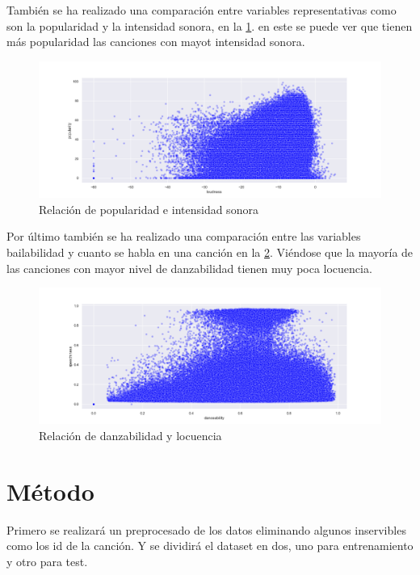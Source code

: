 \documentclass{wsdcr}
\begin{document}
También se ha realizado una comparación entre variables representativas como son la popularidad y la intensidad sonora, en la \figurename{\ref*{fig:relacion popularidad e intensidad sonora}}. en este se puede ver que tienen más popularidad las canciones con mayot intensidad sonora.

\begin{figure}[h!] \includegraphics[width=\columnwidth]{images/popularity_loudness_scatterplot.png} \caption{Relación de popularidad e intensidad sonora} \label{fig:relacion popularidad e intensidad sonora} \end{figure}

Por último también se ha realizado una comparación entre las variables bailabilidad y cuanto se habla en una canción en la \figurename{\ref*{fig:relacion danzabilidad y locuencia}}. Viéndose que la mayoría de las canciones con mayor nivel de danzabilidad tienen muy poca locuencia.

\begin{figure}[h!] \includegraphics[width=\columnwidth]{images/danceability_speechiness_scatterplot.png} \caption{Relación de danzabilidad y locuencia} \label{fig:relacion danzabilidad y locuencia} \end{figure}

\section{Método}
Primero se realizará un preprocesado de los datos eliminando algunos inservibles como los id de la canción. Y se dividirá el dataset en dos, uno para entrenamiento y otro para test.
\end{document}
